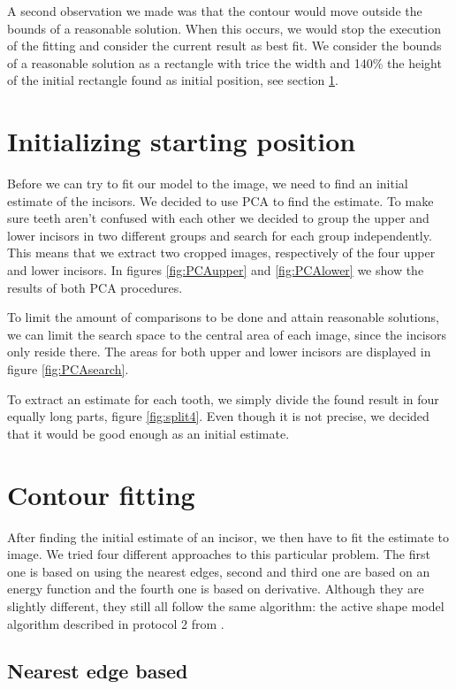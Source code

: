 \documentclass[a4paper,10pt]{article}
\begin{document}
A second observation we made was that the contour would move outside the bounds of a reasonable solution. When this occurs, we would stop the execution of the fitting and consider the current result as best fit. We consider the bounds of a reasonable solution as a rectangle with trice the width and 140\% the height of the initial rectangle found as initial position, see section \ref{sec:initial}.


\section{Initializing starting position}\label{sec:initial}
Before we can try to fit our model to the image, we need to find an initial estimate of the incisors. We decided to use PCA to find the estimate.
To make sure teeth aren't confused with each other we decided to group the upper and lower incisors in two different groups and search for each group independently. This means that we extract two cropped images, respectively of the four upper and lower incisors. In figures \ref{fig:PCAupper} and \ref{fig:PCAlower} we show the results of both PCA procedures.

To limit the amount of comparisons to be done and attain reasonable solutions, we can limit the search space to the central area of each image, since the incisors only reside there. The areas for both upper and lower incisors are displayed in figure \ref{fig:PCAsearch}.

To extract an estimate for each tooth, we simply divide the found result in four equally long parts, figure \ref{fig:split4}. Even though it is not precise, we decided that it would be good enough as an initial estimate.

\section{Contour fitting}\label{sec:fit}
After finding the initial estimate of an incisor, we then have to fit the estimate to image. We tried four different approaches to this particular problem. The first one is based on using the nearest edges, second and third one are based on an energy function and the fourth one is based on derivative. Although they are slightly different, they still all follow the same algorithm: the active shape model algorithm described in protocol 2 from \cite{TemplateAlgorithm}.

\subsection{Nearest edge based}\label{sec:fit_edge}
\end{document}
